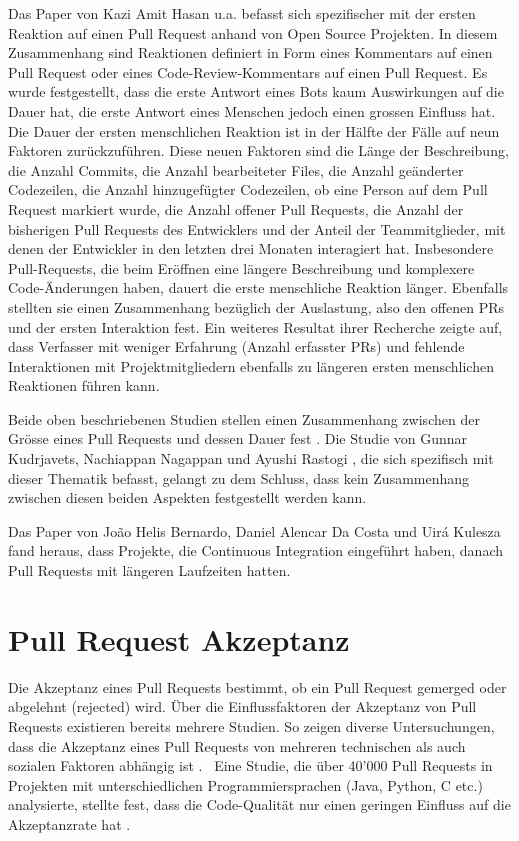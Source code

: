Das Paper von Kazi Amit Hasan u.a.\parencite{hasan_understanding_2023} befasst sich spezifischer mit der ersten Reaktion auf einen Pull Request anhand von Open Source Projekten. In diesem Zusammenhang sind Reaktionen definiert in Form eines Kommentars auf einen Pull Request oder eines Code-Review-Kommentars auf einen Pull Request. Es wurde festgestellt, dass die erste Antwort eines Bots kaum Auswirkungen auf die Dauer hat, die erste Antwort eines Menschen jedoch einen grossen Einfluss hat. Die Dauer der ersten menschlichen Reaktion ist in der Hälfte der Fälle auf neun Faktoren zurückzuführen. Diese neuen Faktoren sind die Länge der Beschreibung, die Anzahl Commits, die Anzahl bearbeiteter Files, die Anzahl geänderter Codezeilen, die Anzahl hinzugefügter Codezeilen,  ob eine Person auf dem Pull Request markiert wurde, die Anzahl offener Pull Requests, die Anzahl der bisherigen Pull Requests des Entwicklers und der Anteil der Teammitglieder, mit denen der Entwickler in den letzten drei Monaten interagiert hat. Insbesondere Pull-Requests, die beim Eröffnen eine längere Beschreibung und komplexere Code-Änderungen haben, dauert die erste menschliche Reaktion länger. Ebenfalls stellten sie einen Zusammenhang bezüglich der Auslastung, also den offenen PRs und der ersten Interaktion fest. Ein weiteres Resultat ihrer Recherche zeigte auf, dass Verfasser mit weniger Erfahrung (Anzahl erfasster PRs) und fehlende Interaktionen mit Projektmitgliedern ebenfalls zu längeren ersten menschlichen Reaktionen führen kann.\parencite{hasan_understanding_2023} 

Beide oben beschriebenen Studien stellen einen Zusammenhang zwischen der Grösse eines Pull Requests und dessen Dauer fest \parencite{yu_wait_2015}\parencite{hasan_understanding_2023}. Die Studie von Gunnar Kudrjavets, Nachiappan Nagappan und Ayushi Rastogi  \parencite{kudrjavets_small_2022}, die sich spezifisch mit dieser Thematik befasst, gelangt zu dem Schluss, dass kein Zusammenhang zwischen diesen beiden Aspekten festgestellt werden kann.

Das Paper von João Helis Bernardo, Daniel Alencar Da Costa und Uirá Kulesza \parencite{bernardo_studying_2018} fand heraus, dass Projekte, die Continuous Integration eingeführt haben, danach Pull Requests mit längeren Laufzeiten hatten.


\section{Pull Request Akzeptanz}
Die Akzeptanz eines Pull Requests bestimmt, ob ein Pull Request gemerged oder abgelehnt (rejected) wird. Über die Einflussfaktoren der Akzeptanz von Pull Requests existieren bereits mehrere Studien.
So zeigen diverse Untersuchungen, dass die Akzeptanz eines Pull Requests von mehreren technischen als auch sozialen Faktoren abhängig ist \parencite{gousios_exploratory_2014}. \
Eine Studie, die über 40'000 Pull Requests in Projekten mit unterschiedlichen Programmiersprachen (Java, Python, C etc.) analysierte, stellte fest, dass die Code-Qualität nur einen geringen Einfluss auf die Akzeptanzrate hat \parencite{kuhejda_pull_2023}.

